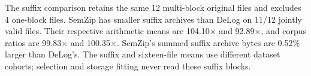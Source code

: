 The suffix comparison retains the same 12 multi-block original files and excludes 4 one-block files. SemZip has smaller suffix archives than DeLog on 11/12 jointly valid files. Their respective arithmetic means are 104.10$\times$ and 92.89$\times$, and corpus ratios are 99.83$\times$ and 100.35$\times$. SemZip's summed suffix archive bytes are 0.52\% larger than DeLog's. The suffix and sixteen-file means use different dataset cohorts; selection and storage fitting never read these suffix blocks.
